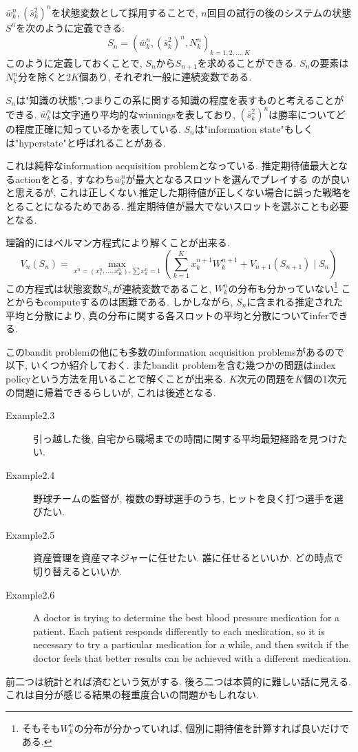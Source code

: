 \documentclass[11pt]{jsbook}
\begin{document}
$\bar{w}_k^n, (\bar{s}_k^2)^n$を状態変数として採用することで, $n$回目の試行の後のシステムの状態$S^n$を次のように定義できる:
\[S_n = \left(\bar{w}_k^n, (\bar{s}_k^2)^n, N_k^n\right)_{k=1,2,\dots,K} \]
このように定義しておくことで, $S_n$から$S_{n+1}$を求めることができる.
$S_n$の要素は$N_k^n$分を除くと$2K$個あり, それぞれ一般に連続変数である.

$S_n$は"知識の状態",つまりこの系に関する知識の程度を表すものと考えることができる.
$\bar{w}_k^n$は文字通り平均的なwinningsを表しており,
$(\bar{s}_k^2)^n$は勝率についてどの程度正確に知っているかを表している.
$S_n$は"information state"もしくは"hyperstate"と呼ばれることがある.

これは純粋なinformation acquisition problemとなっている.
推定期待値最大となるactionをとる, すなわち$\bar{w}_k^n$が最大となるスロットを選んでプレイする
のが良いと思えるが, これは正しくない.推定した期待値が正しくない場合に誤った戦略をとることになるためである.
推定期待値が最大でないスロットを選ぶことも必要となる.

理論的にはベルマン方程式により解くことが出来る.
\begin{equation}
	V_n(S_n) = \max_{x^n=(x_1^n,\dots,x_K^n), \sum x_k^n = 1} \left(\sum_{k=1}^{K}x_k^{n+1} W_k^{n+1} + V_{n+1}(S_{n+1})\mid S_n \right)
\end{equation}
この方程式は状態変数$S_n$が連続変数であること,
$W_k^n$の分布も分かっていない\footnote{そもそも$W_k^n$の分布が分かっていれば, 個別に期待値を計算すれば良いだけである.}
ことからもcomputeするのは困難である.
しかしながら, $S_n$に含まれる推定された平均と分散により,
真の分布に関する各スロットの平均と分散についてinferできる.

このbandit problemの他にも多数のinformation acquisition problemsがあるので
以下, いくつか紹介しておく. 
またbandit problemを含む幾つかの問題はindex policyという方法を用いることで解くことが出来る.
$K$次元の問題を$K$個の1次元の問題に帰着できるらしいが, これは後述となる.

\begin{description}
	\item[Example2.3] 引っ越した後, 自宅から職場までの時間に関する平均最短経路を見つけたい.
	\item[Example2.4] 野球チームの監督が, 複数の野球選手のうち, ヒットを良く打つ選手を選びたい.
	\item[Example2.5] 資産管理を資産マネジャーに任せたい. 誰に任せるといいか. どの時点で切り替えるといいか.
	\item[Example2.6] A doctor is trying to determine the best blood pressure medication for a patient.
	Each patient responds differently to each medication, so it is necessary to try a particular medication
	for a while, and then switch if the doctor feels that better results can be achieved with a different medication.
\end{description}
前二つは統計とれば済むという気がする. 後ろ二つは本質的に難しい話に見える.
これは自分が感じる結果の軽重度合いの問題かもしれない.
\end{document}
